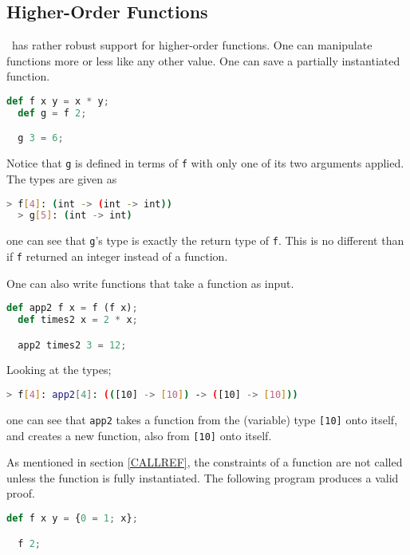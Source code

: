 \subsection{Higher-Order Functions} \label{HOF}

\vampir\ has rather robust support for higher-order functions. One can manipulate functions more or less like any other value. One can save a partially instantiated function.

\begin{lstlisting}[language=Python]
  def f x y = x * y;
  def g = f 2;

  g 3 = 6;
\end{lstlisting}

Notice that \lstinline{g} is defined in terms of \lstinline{f} with only one of its two arguments applied. The types are given as

\begin{lstlisting}[language=bash]
  > f[4]: (int -> (int -> int))
  > g[5]: (int -> int)
\end{lstlisting}

one can see that \lstinline{g}'s type is exactly the return type of \lstinline{f}. This is no different than if \lstinline{f} returned an integer instead of a function.

One can also write functions that take a function as input.

\begin{lstlisting}[language=Python]
  def app2 f x = f (f x);
  def times2 x = 2 * x;

  app2 times2 3 = 12;
\end{lstlisting}

Looking at the types;

\begin{lstlisting}[language=bash]
  > f[4]: app2[4]: (([10] -> [10]) -> ([10] -> [10]))
\end{lstlisting}

one can see that \lstinline{app2} takes a function from the (variable) type \lstinline{[10]} onto itself, and creates a new function, also from \lstinline{[10]} onto itself.

As mentioned in section \ref{CALLREF}, the constraints of a function are not called unless the function is fully instantiated. The following program produces a valid proof.

\begin{lstlisting}[language=Python]
  def f x y = {0 = 1; x};

  f 2;
\end{lstlisting}

